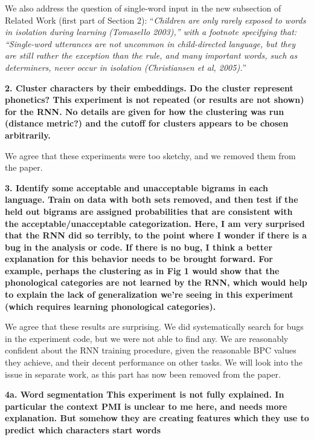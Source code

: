 \documentclass{article}[11pt,a4paper,oneside]
\begin{document}
We also address the question of single-word input in the new subsection of Related Work (first part of Section 2): ``\textit{Children are only rarely exposed to words in isolation during learning (Tomasello 2003),'' with a footnote specifying that: ``Single-word utterances are not uncommon in child-directed language, but they are still rather the exception than the rule, and many important words, such as determiners, never occur in isolation (Christiansen et al, 2005).}''
\newline

\textbf{2. Cluster characters by their embeddings.  Do the cluster represent phonetics? This experiment is not repeated (or results are not shown) for the RNN.  No details are given for how the clustering was run (distance metric?) and the cutoff for clusters appears to be chosen arbitrarily.}

We agree that these experiments were too sketchy, and we removed them from the paper.
\newline

\textbf{3. Identify some acceptable and unacceptable bigrams in each language. Train on data with both sets removed, and then test if the held out bigrams
are assigned probabilities that are consistent with the acceptable/unacceptable categorization. Here, I am very surprised that the RNN did so terribly, to the point where I wonder if there is a bug in the analysis or code.  If there is no bug, I think a better explanation for this behavior needs to be brought forward. For example, perhaps the clustering as in Fig 1 would show that the phonological categories are not learned by the RNN, which would help to explain the lack of generalization we're seeing in this experiment (which requires learning phonological categories).}

We agree that these results are surprising. We did systematically search for bugs in the experiment code, but we were not able to find any. We are reasonably confident about the RNN training procedure, given the reasonable BPC values they achieve, and their decent performance on other tasks. We will look into the issue in separate work, as this part has now been removed from the paper.
\newline

\textbf{4a. Word segmentation This experiment is not fully explained.  In particular the context PMI is unclear to me here, and needs more explanation.  But somehow they are creating features which they use to predict which characters start words}
\end{document}
